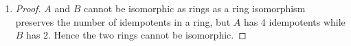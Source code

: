 \documentclass[12pt]{article}
\begin{document}
\begin{enumerate}
    \item[(4)]
    \begin{proof}
        $A$ and $B$ cannot be isomorphic as rings as a ring isomorphism preserves the number
        of idempotents in a ring, but $A$ has 4 idempotents while $B$ has 2. Hence the two rings cannot be isomorphic.
    \end{proof}
\end{enumerate}
\end{document}
